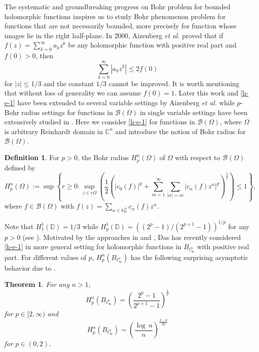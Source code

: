 \documentclass[a4paper,12pt]{amsart}
\newtheorem{thm}{Theorem}[section]
\theoremstyle{definition}
\newtheorem{defn}{Definition}[section]
\begin{document}
The systematic and groundbreaking progress on Bohr problem for bounded holomorphic functions inspires us to study Bohr phenomenon problem for functions that are not necessarily bounded, more precisely for function whose images lie in the right half-plane. In 2000, Aizenberg {\it et al.} \cite{aizn-2000b} proved that if $f(z)=\sum_{k=0}^{\infty}a_{k}z^k$ be any holomorphic function with positive real part and $f(0)>0$, then
\begin{equation} \label{h-e-1}
	\sum_{k=0}^{\infty} |a_{k}z^k| \leq 2 f(0)	
\end{equation}
for $|z|\leq 1/3$ and the constant $1/3$ cannot be improved. It is worth mentioning that without loss of generality we can assume $f(0)=1$.  Later this work and \eqref{h-e-1} have been extended to several variable settings by Aizenberg {\it et al.} \cite{aizenberg-2003} while $p$-Bohr radius settings for functions in $\mathcal{B}(\Omega)$ in single variable settings have been extensively studied in \cite{Djakov & Ramanujan & J. Anal & 2000}. Here we consider \eqref{h-e-1} for functions in $\mathcal{B}(\Omega)$, where $\Omega$ is arbitrary Reinhardt domain in $\mathbb{C}^n$ and introduce the notion of Bohr radius for $\mathcal{B}(\Omega)$. 
\begin{defn}
	For $p>0$, the Bohr radius $H^{n}_{p}(\Omega)$ of $\Omega$ with respect to $\mathcal{B}(\Omega)$ defined by 
	\begin{equation}
		H^{n}_{p}(\Omega):=\sup\left\{r\geq 0:	\sup_{z\in r\Omega} \left(\frac{1}{2}\left(|c_0(f)|^p + \sum_{m=1}^{\infty}\sum_{|\alpha|=m}|c_{\alpha}(f)z^{\alpha}|^p\right)^{\frac{1}{p}}\right)\leq 1\right\},
	\end{equation}
	where $f \in \mathcal{B}(\Omega)$ with $f(z)=\sum_{\alpha\in \mathbb{N}^n_{0}} c_{\alpha}(f) z^{\alpha}$.
\end{defn}
Note that $H^{1}_{1}(\mathbb{D})=1/3$ while $H^{1}_{p}(\mathbb{D})=((2^p -1)/(2^{p+1}-1))^{1/p}$ for any $p>0$ (see \cite{Djakov & Ramanujan & J. Anal & 2000}). Motivated by the approaches in \cite{aizenberg-2003} and \cite{Djakov & Ramanujan & J. Anal & 2000}, Das \cite{das-2023} has recently considered \eqref{h-e-1} in more general setting for holomorphic functions in $B_{\ell^n_{\infty}}$ with positive real part. 
 For different values of $p$, $H^{n}_{p}(B_{\ell^n _\infty})$ has the following surprising asymptotic behavior due to \cite{das-2023}.
\begin{thm} \label{das-thm-2023} \cite{das-2023}
	For any $n>1$, 
	\begin{equation*}
		H^{n}_{p}(B_{\ell^n _\infty})= \left(\frac{2^p -1}{2^{p+1}-1}\right)^{\frac{1}{p}}
	\end{equation*}
	for $p \in [2,\infty)$ and 
	\begin{equation*}
		H^{n}_{p}(B_{\ell^n _\infty}) \sim \left(\frac{\log \, n}{n}\right)^{\frac{2-p}{2p}}
	\end{equation*}
	for $p \in (0,2)$.
\end{thm} 
\end{document}
